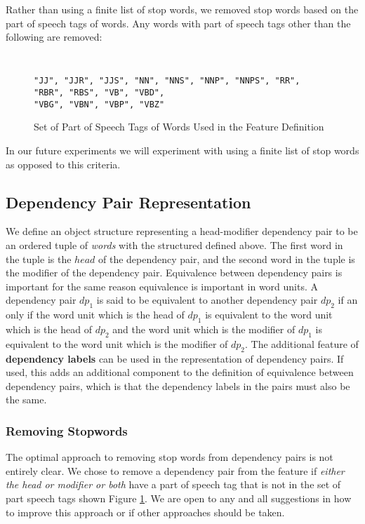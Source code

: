 \documentclass[11pt]{article}
\begin{document}
Rather than using a finite list of stop words, we removed stop words based on the part of speech tags of words. Any words with part of speech tags other than the following are removed:

\begin{figure}[H]
\begin{shaded} \tt
\begin{verbatim}
"JJ", "JJR", "JJS", "NN", "NNS", "NNP", "NNPS", "RR", "RBR", "RBS", "VB", "VBD", 
"VBG", "VBN", "VBP", "VBZ"
\end{verbatim}
\end{shaded}
\caption{Set of Part of Speech Tags of Words Used in the Feature Definition}
\label{fig:KeeperPOS}
\end{figure}

In our future experiments we will experiment with using a finite list of stop words as opposed to this criteria.

\subsection{Dependency Pair Representation}

We define an object structure representing a head-modifier dependency pair to be an ordered tuple of \emph{words} with the structured defined above. The first word in the tuple is the $head$ of the dependency pair, and the second word in the tuple is the modifier of the dependency pair.  Equivalence between dependency pairs is important for the same reason equivalence is important in word units. A dependency pair $dp_1$ is said to be equivalent to another dependency pair $dp_2$ if an only if the word unit which is the head of $dp_1$ is equivalent to the word unit which is the head of $dp_2$ and the word unit which is the modifier of $dp_1$ is equivalent to the word unit which is the modifier of $dp_2$. The additional feature of \textbf{dependency labels} can be used in the representation of dependency pairs. If used, this adds an additional component to the definition of equivalence between dependency pairs, which is that the dependency labels in the pairs must also be the same.

\subsubsection{Removing Stopwords}

The optimal approach to removing stop words from dependency pairs is not entirely clear. We chose to remove a dependency pair from the feature if \emph{either the head or modifier or both} have a part of speech tag that is not in the set of part speech tags shown Figure \ref{fig:KeeperPOS}. We are open to any and all suggestions in how to improve this approach or if other approaches should be taken. 
\end{document}
